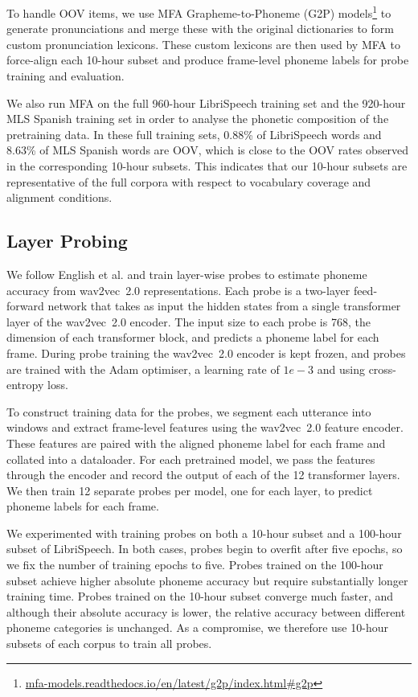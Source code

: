 To handle OOV items, we use MFA Grapheme-to-Phoneme (G2P) models\footnote{\href{https://mfa-models.readthedocs.io/en/latest/g2p/index.html\#g2p}{mfa-models.readthedocs.io/en/latest/g2p/index.html\#g2p}} to generate pronunciations and merge these with the original dictionaries to form custom pronunciation lexicons. These custom lexicons are then used by MFA to force-align each 10-hour subset and produce frame-level phoneme labels for probe training and evaluation.

We also run MFA on the full 960-hour LibriSpeech training set and the 920-hour MLS Spanish training set in order to analyse the phonetic composition of the pretraining data. In these full training sets, 0.88\% of LibriSpeech words and 8.63\% of MLS Spanish words are OOV, which is close to the OOV rates observed in the corresponding 10-hour subsets. This indicates that our 10-hour subsets are representative of the full corpora with respect to vocabulary coverage and alignment conditions.

\subsection{Layer Probing}\label{ed_seubsec:exp_des_probing}
We follow English et al. \cite{english2022domain} and train layer-wise probes to estimate phoneme accuracy from wav2vec~2.0 representations. Each probe is a two-layer feed-forward network that takes as input the hidden states from a single transformer layer of the wav2vec~2.0 encoder. The input size to each probe is 768, the dimension of each transformer block, and predicts a phoneme label for each frame. During probe training the wav2vec~2.0 encoder is kept frozen, and probes are trained with the Adam optimiser, a learning rate of \(1e-3\) and using cross-entropy loss.

To construct training data for the probes, we segment each utterance into windows and extract frame-level features using the wav2vec~2.0 feature encoder. These features are paired with the aligned phoneme label for each frame and collated into a dataloader. For each pretrained model, we pass the features through the encoder and record the output of each of the 12 transformer layers. We then train 12 separate probes per model, one for each layer, to predict phoneme labels for each frame.

We experimented with training probes on both a 10-hour subset and a 100-hour subset of LibriSpeech. In both cases, probes begin to overfit after five epochs, so we fix the number of training epochs to five. Probes trained on the 100-hour subset achieve higher absolute phoneme accuracy but require substantially longer training time. Probes trained on the 10-hour subset converge much faster, and although their absolute accuracy is lower, the relative accuracy between different phoneme categories is unchanged. As a compromise, we therefore use 10-hour subsets of each corpus to train all probes.

